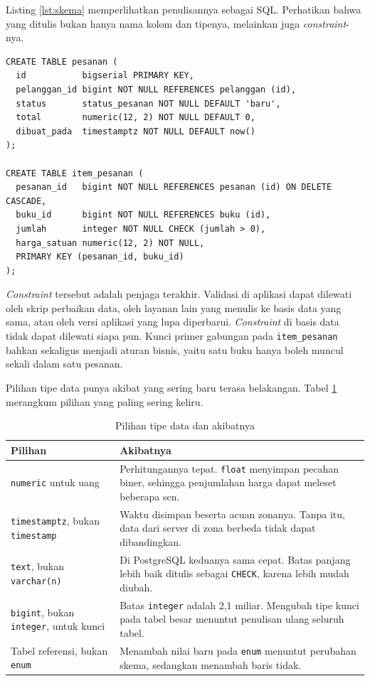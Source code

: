 Listing \ref{lst:skema} memperlihatkan penulisannya sebagai SQL. Perhatikan
bahwa yang ditulis bukan hanya nama kolom dan tipenya, melainkan juga
\textit{constraint}-nya.

\begin{lstlisting}[style=SqlStyle, caption={Potongan skema beserta \textit{constraint}-nya, tersedia di \berkas{sources/chapter03/01-skema.sql}}, label={lst:skema}]
CREATE TABLE pesanan (
  id           bigserial PRIMARY KEY,
  pelanggan_id bigint NOT NULL REFERENCES pelanggan (id),
  status       status_pesanan NOT NULL DEFAULT 'baru',
  total        numeric(12, 2) NOT NULL DEFAULT 0,
  dibuat_pada  timestamptz NOT NULL DEFAULT now()
);

CREATE TABLE item_pesanan (
  pesanan_id   bigint NOT NULL REFERENCES pesanan (id) ON DELETE CASCADE,
  buku_id      bigint NOT NULL REFERENCES buku (id),
  jumlah       integer NOT NULL CHECK (jumlah > 0),
  harga_satuan numeric(12, 2) NOT NULL,
  PRIMARY KEY (pesanan_id, buku_id)
);
\end{lstlisting}

\textit{Constraint} tersebut adalah penjaga terakhir. Validasi di aplikasi dapat dilewati
oleh skrip perbaikan data, oleh layanan lain yang menulis ke basis data yang
sama, atau oleh versi aplikasi yang lupa diperbarui. \textit{Constraint} di basis data
tidak dapat dilewati siapa pun. Kunci primer gabungan pada
\texttt{item\_pesanan} bahkan sekaligus menjadi aturan bisnis, yaitu satu buku
hanya boleh muncul sekali dalam satu pesanan.

Pilihan tipe data punya akibat yang sering baru terasa belakangan. Tabel
\ref{tab:tipe-data} merangkum pilihan yang paling sering keliru.

\begin{table}[!htb]
  \centering
  \caption{Pilihan tipe data dan akibatnya}
  \label{tab:tipe-data}
  \begin{tabularx}{\textwidth}{lX}
    \hline
    \textbf{Pilihan} & \textbf{Akibatnya} \\
    \hline
    \texttt{numeric} untuk uang & Perhitungannya tepat. \texttt{float} menyimpan pecahan biner, sehingga penjumlahan harga dapat meleset beberapa sen. \\
    \hline
    \texttt{timestamptz}, bukan \texttt{timestamp} & Waktu disimpan beserta acuan zonanya. Tanpa itu, data dari server di zona berbeda tidak dapat dibandingkan. \\
    \hline
    \texttt{text}, bukan \texttt{varchar(n)} & Di PostgreSQL keduanya sama cepat. Batas panjang lebih baik ditulis sebagai \texttt{CHECK}, karena lebih mudah diubah. \\
    \hline
    \texttt{bigint}, bukan \texttt{integer}, untuk kunci & Batas \texttt{integer} adalah 2,1 miliar. Mengubah tipe kunci pada tabel besar menuntut penulisan ulang seluruh tabel. \\
    \hline
    Tabel referensi, bukan \texttt{enum} & Menambah nilai baru pada \texttt{enum} menuntut perubahan skema, sedangkan menambah baris tidak. \\
    \hline
  \end{tabularx}
\end{table}

